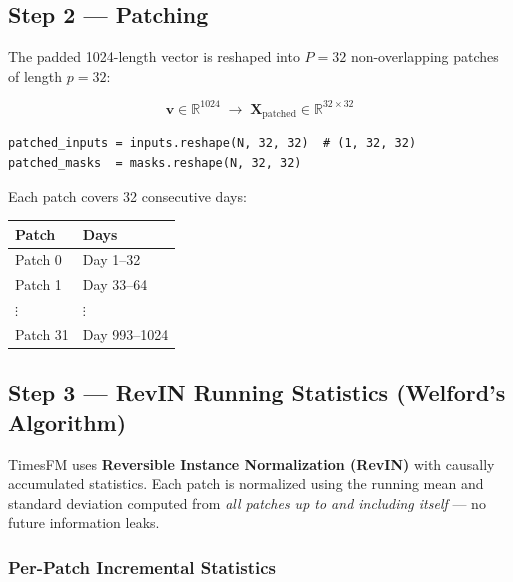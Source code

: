 \documentclass[11pt,a4paper]{article}
\begin{document}
\subsection{Step 2 --- Patching}

The padded 1024-length vector is reshaped into $P = 32$ non-overlapping patches of length $p = 32$:

\[
\mathbf{v} \in \mathbb{R}^{1024} \;\longrightarrow\; \mathbf{X}_{\text{patched}} \in \mathbb{R}^{32 \times 32}
\]

\begin{lstlisting}
patched_inputs = inputs.reshape(N, 32, 32)  # (1, 32, 32)
patched_masks  = masks.reshape(N, 32, 32)
\end{lstlisting}

\noindent
Each patch covers 32 consecutive days:

\begin{center}
\begin{tabular}{@{}ll@{}}
\toprule
\textbf{Patch} & \textbf{Days} \\
\midrule
Patch 0    & Day 1--32 \\
Patch 1    & Day 33--64 \\
$\vdots$   & $\vdots$ \\
Patch 31   & Day 993--1024 \\
\bottomrule
\end{tabular}
\end{center}

\subsection{Step 3 --- RevIN Running Statistics (Welford's Algorithm)}

TimesFM uses \textbf{Reversible Instance Normalization (RevIN)} with causally accumulated statistics. Each patch is normalized using the running mean and standard deviation computed from \emph{all patches up to and including itself} --- no future information leaks.

\subsubsection{Per-Patch Incremental Statistics}
\end{document}
